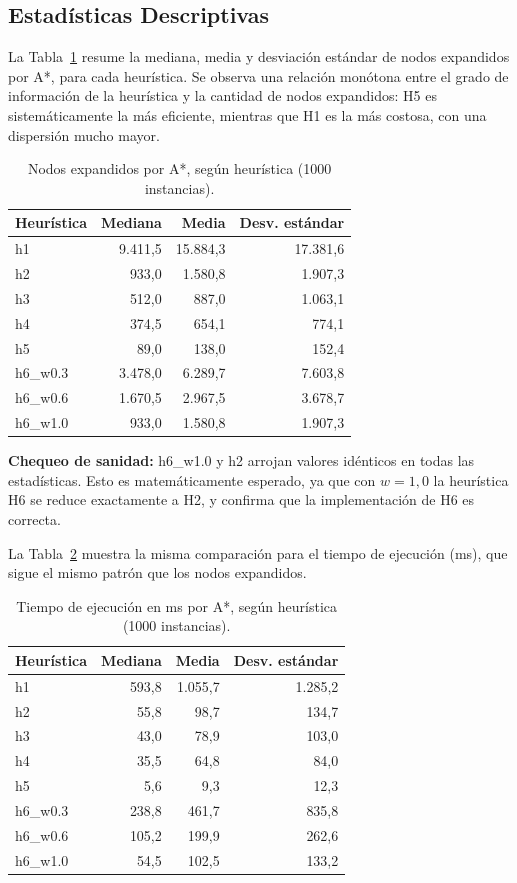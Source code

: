 \documentclass[11pt]{article}
\begin{document}
\subsection{Estadísticas Descriptivas}
La Tabla~\ref{tab:nodos-astar} resume la mediana, media y desviación estándar
de nodos expandidos por A*, para cada heurística. Se observa una relación
monótona entre el grado de información de la heurística y la cantidad de
nodos expandidos: H5 es sistemáticamente la más eficiente, mientras que H1 es
la más costosa, con una dispersión mucho mayor.

\begin{table}[H]
\centering
\caption{Nodos expandidos por A*, según heurística (1000 instancias).}
\label{tab:nodos-astar}
\begin{tabular}{lrrr}
\toprule
Heurística & Mediana & Media & Desv. estándar \\
\midrule
h1 & 9.411,5 & 15.884,3 & 17.381,6 \\
h2 & 933,0 & 1.580,8 & 1.907,3 \\
h3 & 512,0 & 887,0 & 1.063,1 \\
h4 & 374,5 & 654,1 & 774,1 \\
h5 & 89,0 & 138,0 & 152,4 \\
h6\_w0.3 & 3.478,0 & 6.289,7 & 7.603,8 \\
h6\_w0.6 & 1.670,5 & 2.967,5 & 3.678,7 \\
h6\_w1.0 & 933,0 & 1.580,8 & 1.907,3 \\
\bottomrule
\end{tabular}
\end{table}

\noindent
\textbf{Chequeo de sanidad:} h6\_w1.0 y h2 arrojan valores idénticos en todas
las estadísticas. Esto es matemáticamente esperado, ya que con $w=1{,}0$ la
heurística H6 se reduce exactamente a H2, y confirma que la implementación de
H6 es correcta.

La Tabla~\ref{tab:tiempo-astar} muestra la misma comparación para el tiempo
de ejecución (ms), que sigue el mismo patrón que los nodos expandidos.

\begin{table}[H]
\centering
\caption{Tiempo de ejecución en ms por A*, según heurística (1000 instancias).}
\label{tab:tiempo-astar}
\begin{tabular}{lrrr}
\toprule
Heurística & Mediana & Media & Desv. estándar \\
\midrule
h1 & 593,8 & 1.055,7 & 1.285,2 \\
h2 & 55,8 & 98,7 & 134,7 \\
h3 & 43,0 & 78,9 & 103,0 \\
h4 & 35,5 & 64,8 & 84,0 \\
h5 & 5,6 & 9,3 & 12,3 \\
h6\_w0.3 & 238,8 & 461,7 & 835,8 \\
h6\_w0.6 & 105,2 & 199,9 & 262,6 \\
h6\_w1.0 & 54,5 & 102,5 & 133,2 \\
\bottomrule
\end{tabular}
\end{table}
\end{document}
